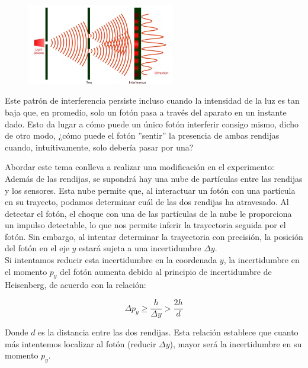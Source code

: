 \documentclass[a4paper]{article}
\begin{document}
    \begin{figure}[h!]
        \centering
        \includegraphics[width = 6.5cm]{../expDOPColor.png}
    \end{figure}

    \indent Este patrón de interferencia persiste incluso cuando la intensidad de la luz es tan baja que, en promedio, solo un fotón pasa a través del aparato en un instante dado. Esto da lugar a cómo puede un único fotón interferir consigo mismo, dicho de otro modo, ¿cómo puede el fotón ''sentir'' la presencia de ambas rendijas cuando, intuitivamente, solo debería pasar por una? \\

    \newpage
    \noindent
    \thispagestyle{fancy}

    \indent Abordar este tema conlleva a realizar una modificación en el experimento: Además de las rendijas, se supondrá hay una nube de partículas entre las rendijas y los sensores. Esta nube permite que, al interactuar un fotón con una partícula en su trayecto, podamos determinar cuál de las dos rendijas ha atravesado. Al detectar el fotón, el choque con una de las partículas de la nube le proporciona un impulso detectable, lo que nos permite inferir la trayectoria seguida por el fotón. Sin embargo, al intentar determinar la trayectoria con precisión, la posición del fotón en el eje $y$ estará sujeta a una incertidumbre $\Delta y$.\\

    \indent Si intentamos reducir esta incertidumbre en la coordenada $y$, la incertidumbre en el momento $p_y$ del fotón aumenta debido al principio de incertidumbre de Heisenberg, de acuerdo con la relación:

    \begin{equation}
        \Delta p_y \geq \frac{h}{\Delta y} > \frac{2h}{d} \tag*{}
    \end{equation}

    \indent Donde $d$ es la distancia entre las dos rendijas. Esta relación establece que cuanto más intentemos localizar al fotón (reducir $\Delta y$), mayor será la incertidumbre en su momento $p_y$. \\
\end{document}
